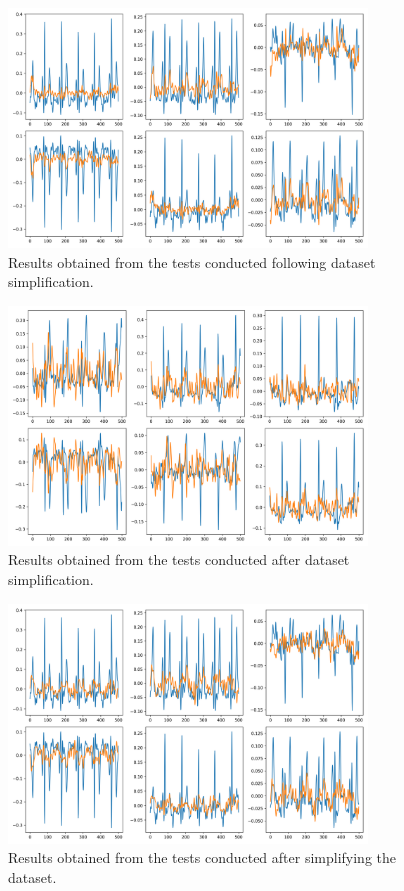 \documentclass[12pt,english]{report}
\begin{document}
\begin{figure}[H]
    \centering
    \includegraphics[width=0.85\textwidth]{images/first_cnn_result_second_plot_0.png}
    \captionsetup{justification=centering}
    \caption{Results obtained from the tests conducted following dataset simplification.}
    \label{fig:first_cnn_result_second_plot_0}
\end{figure}
\begin{figure}[H]
    \centering
    \includegraphics[width=0.85\textwidth]{images/first_cnn_result_second_plot_1.png}
    \captionsetup{justification=centering}
    \caption{Results obtained from the tests conducted after dataset simplification.}
    \label{fig:first_cnn_result_second_plot_1}
\end{figure}
\begin{figure}[H]
    \centering
    \includegraphics[width=0.85\textwidth]{images/second_cnn_result_second_plot_0.png}
    \captionsetup{justification=centering}
    \caption{Results obtained from the tests conducted after simplifying the dataset.}
    \label{fig:second_cnn_result_second_plot_0}
\end{figure}
\end{document}

